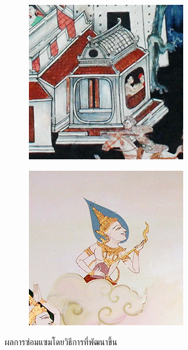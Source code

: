 \documentclass[xcolor=dvipsnames, xetex,serif]{beamer}
\begin{document}
\begin{frame}
\begin{figure}[H]
\begin{subfigure}{0.15\linewidth}
            \end{subfigure}
            \begin{subfigure}{0.15\linewidth}
                \centering
                \includegraphics[width=0.9\linewidth]{images/result_ex4/multisplitbergman_case04.png}			
            \end{subfigure}
            \begin{subfigure}{0.15\linewidth}
                \centering
                \includegraphics[width=0.9\linewidth]{images/result_ex4/multisplitbergman_case05.png}			
            \end{subfigure}
            \caption{ผลการซ่อมแซมโดยวิธีการที่พัฒนาขึ้น}
        \end{figure}
    \end{frame}
\end{document}
